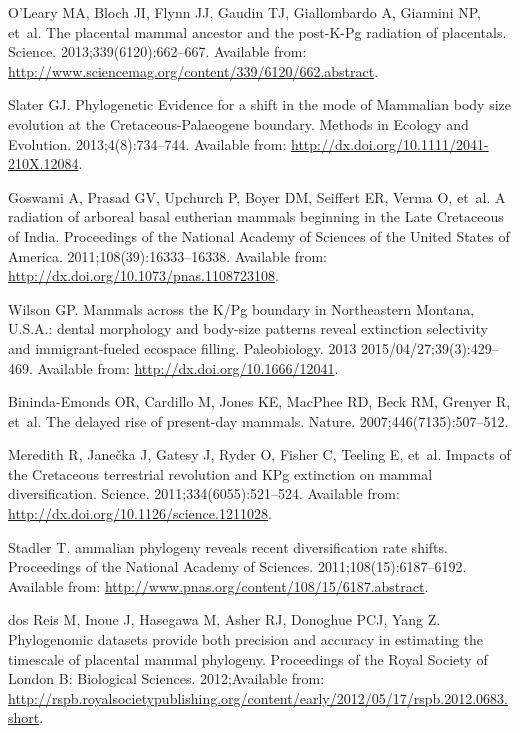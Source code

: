 \documentclass[12pt,letterpaper]{article}
\begin{document}
\begin{thebibliography}{10}
O'Leary MA, Bloch JI, Flynn JJ, Gaudin TJ, Giallombardo A, Giannini NP, et~al.
\newblock The placental mammal ancestor and the post-{K}-{P}g radiation of
  placentals.
\newblock Science. 2013;339(6120):662--667.
\newblock Available from:
  \url{http://www.sciencemag.org/content/339/6120/662.abstract}.

Slater GJ.
\newblock Phylogenetic {E}vidence for a shift in the mode of {M}ammalian body
  size evolution at the {C}retaceous-{P}alaeogene boundary.
\newblock Methods in Ecology and Evolution. 2013;4(8):734--744.
\newblock Available from: \url{http://dx.doi.org/10.1111/2041-210X.12084}.

Goswami A, Prasad GV, Upchurch P, Boyer DM, Seiffert ER, Verma O, et~al.
\newblock A radiation of arboreal basal eutherian mammals beginning in the
  {L}ate {C}retaceous of {I}ndia.
\newblock Proceedings of the National Academy of Sciences of the United States
  of {A}merica. 2011;108(39):16333--16338.
\newblock Available from: \url{http://dx.doi.org/10.1073/pnas.1108723108}.

Wilson GP.
\newblock Mammals across the {K}/{P}g boundary in {N}ortheastern {M}ontana,
  {U.S.A}.: dental morphology and body-size patterns reveal extinction
  selectivity and immigrant-fueled ecospace filling.
\newblock Paleobiology. 2013 2015/04/27;39(3):429--469.
\newblock Available from: \url{http://dx.doi.org/10.1666/12041}.

Bininda-Emonds OR, Cardillo M, Jones KE, MacPhee RD, Beck RM, Grenyer R, et~al.
\newblock The delayed rise of present-day mammals.
\newblock Nature. 2007;446(7135):507--512.

Meredith R, Jane\v{c}ka J, Gatesy J, Ryder O, Fisher C, Teeling E, et~al.
\newblock Impacts of the {C}retaceous terrestrial revolution and {K}{P}g
  extinction on mammal diversification.
\newblock Science. 2011;334(6055):521--524.
\newblock Available from: \url{http://dx.doi.org/10.1126/science.1211028}.

Stadler T.
ammalian phylogeny reveals recent diversification rate shifts.
\newblock Proceedings of the National Academy of Sciences.
  2011;108(15):6187--6192.
\newblock Available from:
  \url{http://www.pnas.org/content/108/15/6187.abstract}.

dos Reis M, Inoue J, Hasegawa M, Asher RJ, Donoghue PCJ, Yang Z.
\newblock Phylogenomic datasets provide both precision and accuracy in
  estimating the timescale of placental mammal phylogeny.
\newblock Proceedings of the Royal Society of London B: Biological Sciences.
  2012;Available from:
  \url{http://rspb.royalsocietypublishing.org/content/early/2012/05/17/rspb.2012.0683.short}.


\end{thebibliography}
\end{document}
